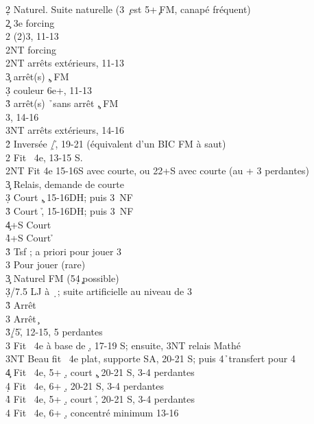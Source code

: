 \documentclass[a4paper]{article}
\begin{document}
\begin{bidtable}
2\d \> Naturel. Suite naturelle (3 \c\ est 5+\c\ FM, canapé fréquent)\+\\
2\c \> 3e forcing\+\\
2\s \> (2)3\s , 11-13\+\\
2NT \> forcing\-\\
2NT \> arrêts extérieurs, 11-13\\
3\c \> arrêt(s) \c , FM\\
3\d \> couleur 6e+, 11-13\\
3\h \> arrêt(s) \h\ sans arrêt \c , FM\\
3\s {}\s , 14-16\\
3NT \> arrêts extérieurs, 14-16\-\-\\
2\h \> Inversée \d /\h , 19-21 (équivalent d'un BIC FM à saut)\\
2\s \> Fit \s\ 4e, 13-15 S.\\
2NT \> Fit 4e 15-16S avec courte, ou 22+S avec courte (au + 3 perdantes)\+\\
3\c \> Relais, demande de courte\+\\
3\d \> Court \c , 15-16DH; puis 3\s\ NF\\
3\h \> Court \h , 15-16DH; puis 3\s\ NF\\
4\c {}+S Court \c \\
4\h {}+S Court \h \-\\
3\h \> Tsf \s ; a priori pour jouer 3\s \\
3\s \> Pour jouer (rare)\-\\
3\c \> Naturel FM (5\d 4\c\ possible)\\
3\d {}/7.5 LJ à \d\ ; suite artificielle au niveau de 3\+\\
3\h \> Arrêt \h \\
3\s \> Arrêt \c \-\\
3\h {}\d /5\h , 12-15, 5 perdantes\\
3\s \> Fit \s\ 4e à base de \d , 17-19 S; ensuite, 3NT relais Mathé\\
3NT \> Beau fit \s\ 4e plat, supporte SA, 20-21 S; puis 4\h\ transfert pour 4\s \\
4\c \> Fit \s\ 4e, 5+ \d , court \c , 20-21 S, 3-4 perdantes\\
4\d \> Fit \s\ 4e, 6+ \d , 20-21 S, 3-4 perdantes\\
4\h \> Fit \s\ 4e, 5+ \d , court \h , 20-21 S, 3-4 perdantes\\
4\s \> Fit \s\ 4e, 6+ \d , concentré minimum 13-16
\end{bidtable}
\end{document}
